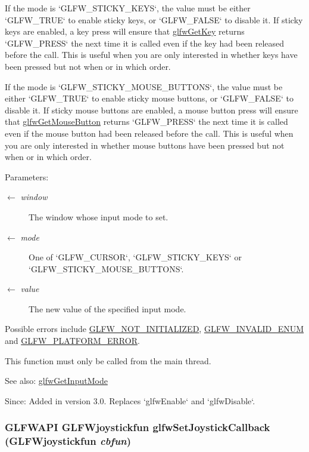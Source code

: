 If the mode is `GLFW\_\-STICKY\_\-KEYS`, the value must be either `GLFW\_\-TRUE` to enable sticky keys, or `GLFW\_\-FALSE` to disable it. If sticky keys are enabled, a key press will ensure that \hyperlink{group__input_g7d8ad8ffaf272808f04e1d5d33ec8859}{glfwGetKey} returns `GLFW\_\-PRESS` the next time it is called even if the key had been released before the call. This is useful when you are only interested in whether keys have been pressed but not when or in which order.

If the mode is `GLFW\_\-STICKY\_\-MOUSE\_\-BUTTONS`, the value must be either `GLFW\_\-TRUE` to enable sticky mouse buttons, or `GLFW\_\-FALSE` to disable it. If sticky mouse buttons are enabled, a mouse button press will ensure that \hyperlink{group__input_g6da5efb04f700c312a57a169fa9393a0}{glfwGetMouseButton} returns `GLFW\_\-PRESS` the next time it is called even if the mouse button had been released before the call. This is useful when you are only interested in whether mouse buttons have been pressed but not when or in which order.

\begin{Desc}
\item[Parameters:]
\begin{description}
\item[\mbox{$\leftarrow$} {\em window}]The window whose input mode to set. \item[\mbox{$\leftarrow$} {\em mode}]One of `GLFW\_\-CURSOR`, `GLFW\_\-STICKY\_\-KEYS` or `GLFW\_\-STICKY\_\-MOUSE\_\-BUTTONS`. \item[\mbox{$\leftarrow$} {\em value}]The new value of the specified input mode.\end{description}
\end{Desc}
Possible errors include \hyperlink{group__errors_g2374ee02c177f12e1fa76ff3ed15e14a}{GLFW\_\-NOT\_\-INITIALIZED}, \hyperlink{group__errors_g76f6bb9c4eea73db675f096b404593ce}{GLFW\_\-INVALID\_\-ENUM} and \hyperlink{group__errors_gd44162d78100ea5e87cdd38426b8c7a1}{GLFW\_\-PLATFORM\_\-ERROR}.

This function must only be called from the main thread.

\begin{Desc}
\item[See also:]\hyperlink{group__input_g1248dd5b1e566b2817e71547564d6af9}{glfwGetInputMode}\end{Desc}
\begin{Desc}
\item[Since:]Added in version 3.0. Replaces `glfwEnable` and `glfwDisable`. \end{Desc}
\hypertarget{group__input_g07524a1122a03642b1d28822ea931094}{
\subsubsection[glfwSetJoystickCallback]{\setlength{\rightskip}{0pt plus 5cm}GLFWAPI {\bf GLFWjoystickfun} glfwSetJoystickCallback ({\bf GLFWjoystickfun} {\em cbfun})}}
\label{group__input_g07524a1122a03642b1d28822ea931094}


